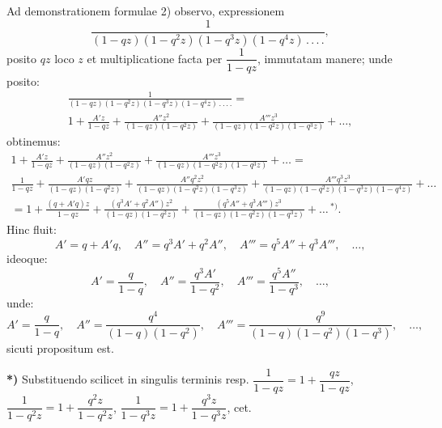 \documentclass{article}
\begin{document}
Ad demonstrationem formulae 2) observo, expressionem
\[
\frac{1}{(1-qz)(1-q^{2}z)(1-q^{3}z)(1-q^{4}z)\,.\,.\,.\,.},
\]
posito $qz$ loco $z$ et multiplicatione facta per $\dfrac{1}{1-qz}$, immutatam manere; unde posito:
\[
\begin{gathered}
\frac{1}{(1-qz)(1-q^{2}z)(1-q^{3}z)(1-q^{4}z)\,.\,.\,.\,.}=\\[1ex]
1+\frac{A'z}{1-qz}+\frac{A''z^{2}}{(1-qz)(1-q^{2}z)}+\frac{A'''z^{3}}{(1-qz)(1-q^{2}z)(1-q^{3}z)}+\ldots,
\end{gathered}
\]
obtinemus:
\[
\begin{gathered}
1+\frac{A'z}{1-qz}+\frac{A''z^{2}}{(1-qz)(1-q^{2}z)}+\frac{A'''z^{3}}{(1-qz)(1-q^{2}z)(1-q^{3}z)}+\ldots=\\[1.5ex]
\frac{1}{1-qz}+\frac{A'qz}{(1-qz)(1-q^{2}z)}+\frac{A''q^{2}z^{2}}{(1-qz)(1-q^{2}z)(1-q^{3}z)}+\frac{A'''q^{3}z^{3}}{(1-qz)(1-q^{2}z)(1-q^{3}z)(1-q^{4}z)}+\ldots\\[1.5ex]
=1+\frac{(q+A'q)z}{1-qz}+\frac{(q^{3}A'+q^{2}A'')z^{2}}{(1-qz)(1-q^{2}z)}+\frac{(q^{5}A''+q^{3}A''')z^{3}}{(1-qz)(1-q^{2}z)(1-q^{3}z)}+\ldots\,{}^{*)}.
\end{gathered}
\]
Hinc fluit:
\[
A'=q+A'q,\quad A''=q^{3}A'+q^{2}A'',\quad A'''=q^{5}A''+q^{3}A''',\quad\ldots,
\]
ideoque:
\[
A'=\frac{q}{1-q},\quad A''=\frac{q^{3}A'}{1-q^{2}},\quad A'''=\frac{q^{5}A''}{1-q^{3}},\quad\ldots,
\]
unde:
\[
A'=\frac{q}{1-q},\quad A''=\frac{q^{4}}{(1-q)(1-q^{2})},\quad A'''=\frac{q^{9}}{(1-q)(1-q^{2})(1-q^{3})},\quad\ldots,
\]
sicuti propositum est.

\textbf{*)} Substituendo scilicet in singulis terminis resp. $\dfrac{1}{1-qz}=1+\dfrac{qz}{1-qz}$, $\dfrac{1}{1-q^{2}z}=1+\dfrac{q^{2}z}{1-q^{2}z}$, $\dfrac{1}{1-q^{3}z}=1+\dfrac{q^{3}z}{1-q^{3}z}$, cet.
\end{document}
